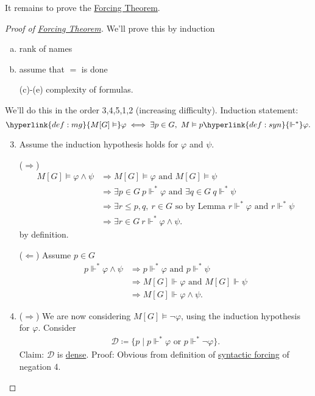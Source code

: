 \documentclass{article}
\newcommand{\1}{\mathbbm{1}}
\let\models\vDash
\let\forces\Vdash
\begin{document}
It remains to prove the \hyperlink{thm:forcing}{Forcing Theorem}.
\begin{proof}[Proof of \hyperlink{thm:forcing}{Forcing Theorem}]
  We'll prove this by induction
  \begin{enumerate}[(a)]
    \item rank of names
    \item assume that $=$ is done
    \item[(c)-(e)] complexity of formulas.
  \end{enumerate}
  We'll do this in the order 3,4,5,1,2 (increasing difficulty).
  Induction statement:
  \begin{equation*}
    \hyperlink{def:mg}{M[G] \models} \varphi \iff \exists p \in G, \ M \models p \hyperlink{def:syn}{\Vdash^*} \varphi.
  \end{equation*}
  \begin{enumerate}\setcounter{enumi}{2}
    \item
      Assume the induction hypothesis holds for $\varphi$ and $\psi$.

      ($\Rightarrow$)
      \begin{align*}
        M[G] \models \varphi \land \psi &\Rightarrow M[G]  \models \varphi \text{ and } M[G] \models \psi \\
                                        &\Rightarrow \exists p \in G \ p \Vdash^* \varphi \text{ and } \exists q \in G \ q \Vdash^* \psi \\
                                        &\Rightarrow \exists r \leq p,q,\ r \in G \text{ so by Lemma } r \Vdash^* \varphi \text{ and } r \Vdash^* \psi \\
                                        &\Rightarrow \exists r \in G\ r \Vdash^* \varphi \land \psi.
      \end{align*}
      by definition.

      ($\Leftarrow$) Assume $p \in G$
      \begin{align*}
        p \forces^* \varphi \land \psi &\Rightarrow p \forces^* \varphi \text{ and } p \Vdash^* \psi \\
                                       &\Rightarrow M[G] \forces \varphi \text{ and } M[G] \forces \psi \\
                                       &\Rightarrow M[G] \forces \varphi \land \psi.
      \end{align*}
    \item ($\Rightarrow$) We are now considering $M[G] \models \neg\varphi$, using the induction hypothesis for $\varphi$. Consider
      \begin{align*}
        \mathcal{D} \coloneqq \{p \mid p \forces^* \varphi \text{ or } p \forces^* \neg \varphi \}.
      \end{align*}
      Claim: $\mathcal{D}$ is \hyperlink{def:dense}{dense}. Proof: Obvious from definition of \hyperlink{def:syn}{syntactic forcing} of negation 4.


\end{enumerate}
\end{proof}
\end{document}
